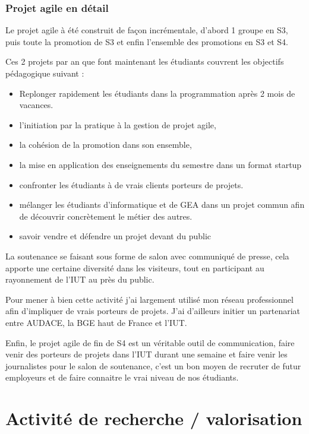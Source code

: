 \documentclass[a4paper]{article}
\begin{document}
\subsubsection{Projet agile en détail}

Le projet agile à été construit de façon incrémentale, d'abord 1 groupe en S3, puis toute la promotion de S3 et enfin l'ensemble des promotions en S3 et S4.

Ces 2 projets par an que font maintenant les étudiants couvrent les objectifs pédagogique suivant : 
\begin{itemize}
\item Replonger rapidement les étudiants dans la programmation après 2 mois de vacances.
\item l'initiation par la pratique à la gestion de projet agile, 
\item la cohésion de la promotion dans son ensemble,
\item la mise en application des enseignements du semestre dans un format startup
\item confronter les étudiants à de vrais clients porteurs de projets.
\item mélanger les étudiants d'informatique et de GEA dans un projet commun afin de découvrir concrètement le métier des autres.
\item savoir vendre et défendre un projet devant du public 
\end{itemize}

La soutenance se faisant sous forme de salon avec communiqué de presse, cela apporte une certaine diversité dans les visiteurs, tout en participant au rayonnement de l'IUT au près du public.

Pour mener à bien cette activité j'ai largement utilisé mon réseau professionnel afin d'impliquer de vrais porteurs de projets. 
J'ai d'ailleurs initier un partenariat entre AUDACE, la BGE haut de France et l'IUT.

Enfin, le projet agile de fin de S4 est un véritable outil de communication, faire venir des porteurs de projets dans l'IUT durant une semaine et faire venir les journalistes pour le salon de soutenance, c'est un bon moyen de recruter de futur employeurs et de faire connaitre le vrai niveau de nos étudiants.

\subsubsection{}

\section{Activité de recherche / valorisation}
\end{document}
